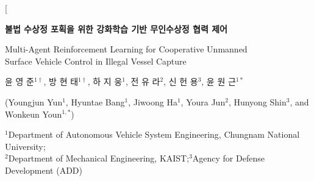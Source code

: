 \documentclass[9pt,twocolumn,a4paper]{extarticle}
\begin{document}
\twocolumn[{%
\begin{@twocolumnfalse}
\begin{center}
{
{\sffamily\bfseries\fontsize{16}{20}\selectfont 불법 수상정 포획을 위한 강화학습 기반 무인수상정 협력 제어\par}
\vspace{1mm}
{\fontsize{15.5}{19}\selectfont Multi-Agent Reinforcement Learning for Cooperative Unmanned\\
Surface Vehicle Control in Illegal Vessel Capture\par}
\vspace{3mm}
{\sffamily\fontsize{10}{13}\selectfont 윤 영 준$^{1\dagger}$, 방 현 태$^{1\dagger}$, 하 지 웅$^{1}$, 전 유 라$^{2}$, 신 헌 용$^{3}$, 윤 원 근$^{1*}$\par}
\vspace{1mm}
{\fontsize{9}{12}\selectfont (Youngjun Yun$^{1}$, Hyuntae Bang$^{1}$, Jiwoong Ha$^{1}$, Youra Jun$^{2}$, Hunyong Shin$^{3}$, and Wonkeun Youn$^{1,*}$)\par}
\vspace{1mm}
{\fontsize{8}{10}\selectfont $^{1}$Department of Autonomous Vehicle System Engineering, Chungnam National University;\\
$^{2}$Department of Mechanical Engineering, KAIST;\quad $^{3}$Agency for Defense Development (ADD)\par}
}
\end{center}
\vspace{2mm}


\end{@twocolumnfalse}}
\end{document}
